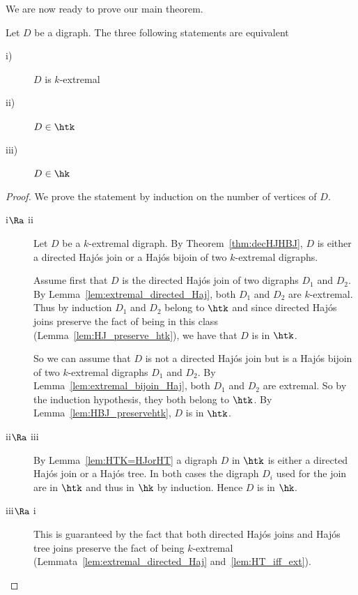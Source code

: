 We are now ready to prove our main theorem.
\begin{theorem} Let $D$ be a digraph. The three following statements are equivalent
\begin{description}
\item[i)] $D$ is $k$-extremal
\item[ii)] $D\in \htk$
\item[iii)] $D \in \hk$
\end{description}
\end{theorem}

\begin{proof}
We prove the statement by induction on the number of vertices of $D$.

\begin{description}
\item[i$\Ra$ ii]

Let $D$ be a $k$-extremal digraph. By Theorem~\ref{thm:decHJHBJ}, $D$ is either a directed Haj\'os join or a Haj\'os bijoin of two $k$-extremal digraphs.

Assume first that $D$ is the directed Haj\'os join of two digraphs $D_1$ and $D_2$. By Lemma~\ref{lem:extremal_directed_Haj}, both $D_1$ and $D_2$ are $k$-extremal. Thus by induction $D_1$ and $D_2$ belong to $\htk$ and since directed Haj\'os joins preserve the fact of being in this class (Lemma~\ref{lem:HJ_preserve_htk}), we have that $D$ is in $\htk$.

So we can assume that $D$ is not a directed Haj\'os join but is a Haj\'os bijoin of two $k$-extremal digraphs $D_1$ and $D_2$. By Lemma~\ref{lem:extremal_bijoin_Haj}, both $D_1$ and $D_2$ are extremal. So by the induction hypothesis, they both belong to $\htk$. By Lemma~\ref{lem:HBJ_preservehtk}, $D$ is in $\htk$. 


\item[ii$\Ra$ iii] By Lemma~\ref{lem:HTK=HJorHT} a digraph $D$ in $\htk$ is either a directed Haj\'os join or a Haj\'os tree. In both cases the digraph $D_i$ used for the join are in $\htk$ and thus in $\hk$ by induction. Hence $D$ is in $\hk$.

\item[iii$\Ra$ i] This is guaranteed by the fact that both directed Haj\'os joins and Haj\'os tree joins preserve the fact of being $k$-extremal (Lemmata~\ref{lem:extremal_directed_Haj} and~\ref{lem:HT_iff_ext}).
\end{description}
\end{proof}



